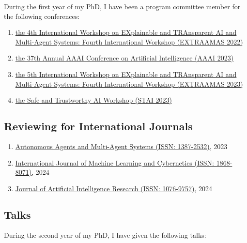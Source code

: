 \documentclass[11pt]{article}
\begin{document}
During the first year of my PhD, I have been a program committee member for the following conferences:

\begin{enumerate}
	\item \href{https://extraamas.ehealth.hevs.ch/archive.html#organizations-2022}{the 4th International Workshop on EXplainable and TRAnsparent AI and Multi-Agent Systems: Fourth International Workshop (EXTRAAMAS 2022)}
	\item \href{https://apice.unibo.it/xwiki/bin/view/Event/Aaai2023}{the 37th Annual AAAI Conference on Artificial Intelligence (AAAI 2023)}
	\item \href{https://apice.unibo.it/xwiki/bin/view/Event/Prima2023}{the 5th International Workshop on EXplainable and TRAnsparent AI and Multi-Agent Systems: Fourth International Workshop (EXTRAAMAS 2023)}
	\item \href{https://web.archive.org/web/20240225110652/https://www.stai.uk/stai-23-iclp}{the Safe and Trustworthy AI Workshop (STAI 2023)}
	\end{enumerate}

\subsection{Reviewing for International Journals}\label{subsec:reviewing-for-international-journals}

\begin{enumerate}
	\item \href{https://link.springer.com/journal/10458}{Autonomous Agents and Multi-Agent Systems (ISSN: 1387-2532)}, 2023
	\item \href{https://link.springer.com/journal/13042}{International Journal of Machine Learning and Cybernetics (ISSN: 1868-8071)}, 2024
	\item \href{https://www.jair.org/index.php/jair/index}{Journal of Artificial Intelligence Research (ISSN: 1076-9757)}, 2024
\end{enumerate}


\subsection{Talks}\label{subsec:talks}

During the second year of my PhD, I have given the following talks:
\end{document}
